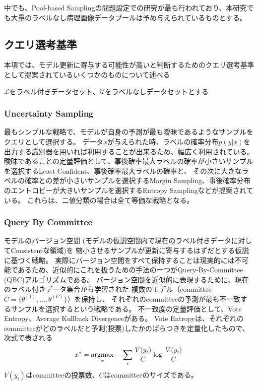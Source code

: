 中でも、Pool-based Samplingの問題設定での研究が最も行われており、本研究でも大量のラベルなし病理画像データプールは予め与えられているものとする。

\subsection{クエリ選考基準}
\label{query_strategy}
本項では、モデル更新に寄与する可能性が高いと判断するためのクエリ選考基準として提案されているいくつかのものについて述べる

$\mathcal{L}$をラベル付きデータセット、$\mathcal{U}$をラベルなしデータセットとする

\subsubsection{Uncertainty Sampling}
最もシンプルな戦略で、モデルが自身の予測が最も曖昧であるようなサンプルをクエリとして選択する。
データ$x$が与えられた時、ラベルの確率分布$p(y|x)$を出力する識別器を用いれば利用することが出来るため、幅広く利用されている。
曖昧であることの定量評価として、事後確率最大ラベルの確率が小さいサンプルを選択するLeast Confident、事後確率最大ラベルの確率と、
その次に大きなラベルの確率との差が小さいサンプルを選択するMargin Sampling、事後確率分布のエントロピーが大きいサンプルを選択するEntropy Samplingなどが提案されている。
これらは、二値分類の場合は全て等価な戦略となる。

\subsubsection{Query By Committee}
モデルのバージョン空間 (モデルの仮説空間内で現在のラベル付きデータに対してConsistentな領域)を
縮小させるサンプルが更新に寄与するはずだとする仮説に基づく戦略。
実際にバージョン空間をすべて保持することは現実的には不可能であるため、近似的にこれを扱うための手法の一つがQuery-By-Committee (QBC)\cite{seung1992query}アルゴリズムである。
バージョン空間を近似的に表現するために、現在のラベル付きデータ集合から学習された
複数のモデル（committee $C=\{ \theta^{(1)}, \dots, \theta^{(C)}\}$）を保持し、
それぞれのcommitteeの予測が最も不一致するサンプルを選択するという戦略である。
不一致度の定量評価として、Vote Entropy、Average Kullback Divergenceがある。
Vote Entropyは、それぞれのcommitteeがどのラベルだと予測(投票)したかのばらつきを定量化したもので、次式で表される
\begin{equation}
    x^{*} = \argmax_x \: - \sum_i \frac{V(y_i)}{C} \log \, \frac{V(y_i)}{C}
\end{equation}
$V(y_i)$はcommitteeの投票数、$C$はcommitteeのサイズである。


